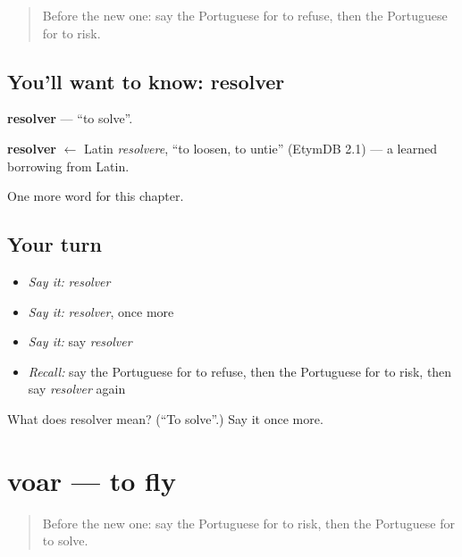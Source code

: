 \label{lesson:PT-C176-resolver}



\begin{quote}
Before the new one: say the Portuguese for to refuse, then the Portuguese for to risk.
\end{quote}

\subsection*{You'll want to know: resolver}
\textbf{resolver} — \textquotedblleft{}to solve\textquotedblright{}.

\begin{cousinweb}
\textbf{resolver} $\leftarrow$ Latin \emph{resolvere}, \textquotedblleft{}to loosen, to untie\textquotedblright{} (EtymDB 2.1) — a learned borrowing from Latin.
\end{cousinweb}

\begin{grammarlens}[title={What you've built}]
One more word for this chapter.
\end{grammarlens}

\subsection*{Your turn}
\begin{itemize}
\raggedright
  \item \emph{Say it:} \emph{resolver}
  \item \emph{Say it:} \emph{resolver}, once more
  \item \emph{Say it:} say \emph{resolver}
  \item \emph{Recall:} say the Portuguese for to refuse, then the Portuguese for to risk, then say \emph{resolver} again
\end{itemize}

\begin{tcolorbox}[breakable,colback=teal!4,colframe=teal!35!black,title={Before you move on}]
What does resolver mean? (\textquotedblleft{}To solve\textquotedblright{}.) Say it once more.
\end{tcolorbox}
\section[voar]{voar — to fly}

\label{lesson:PT-C176-voar}



\begin{quote}
Before the new one: say the Portuguese for to risk, then the Portuguese for to solve.
\end{quote}


